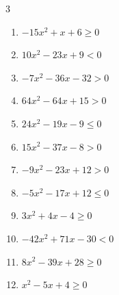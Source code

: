 \begin{multicols}{3}
\begin{enumerate}
  \item $-15x^{2}+x+6\geq 0$


  \item $10x^{2}-23x+9<0$


  \item $-7x^{2}-36x-32>0$


  \item $64x^{2}-64x+15>0$


  \item $24x^{2}-19x-9\leq 0$


\columnbreak %

  \item $15x^{2}-37x-8>0$


  \item $-9x^{2}-23x+12>0$


  \item $-5x^{2}-17x+12\leq 0$


  \item $3x^{2}+4x-4\geq 0$


  \item $-42x^{2}+71x-30<0$


  \item $8x^{2}-39x+28\geq 0$


  \item $x^{2}-5x+4\geq 0$

        \phantom{$\displaystyle x \leqq 1 , \; 4 \leqq x$}


\end{enumerate}
\end{multicols}
